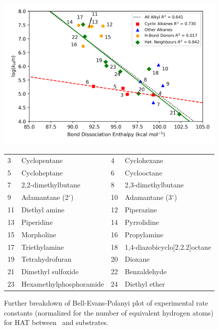\begin{doublespace}
\begin{figure}[!htbp]
  \centering
  \includegraphics[width=\textwidth]{figures/bep-breakdown}
  \begin{tabularx}{\textwidth}{| l X l X |}
    \hline
    3 & Cyclopentane & 4 & Cyclohexane \\
    5 & Cycloheptane & 6 & Cyclooctane \\
    7 & 2,2-dimethylbutane & 8 & 2,3-dimethylbutane \\
    9 & Adamantane (2$^\circ$) & 10 & Adamantane (3$^\circ$) \\
    11 & Diethyl amine & 12 & Piperazine \\
    13 & Piperidine & 14 & Pyrrolidine \\
    15 & Morpholine & 16 & Propylamine \\
    17 & Triethylamine & 18 & 1,4-diazobicyclo[2.2.2]octane \\
    19 & Tetrahydrofuran & 20 & Dioxane \\
    21 & Dimethyl sulfoxide & 22 & Benzaldehyde \\
    23 & Hexamethylphosphoramide & 24 & Diethyl ether \\
    \hline
  \end{tabularx}
  \caption[Further breakdown of Bell-Evans-Polanyi plot of experimental rate
  constants (normalized for the number of equivalent hydrogen atoms) for HAT
  between \cumo\ and alkyl substrates against BDEs calculated using the
  ROCBS-QB3 method.]{Further breakdown of Bell-Evans-Polanyi plot of
  experimental rate constants (normalized for the number of equivalent hydrogen
  atoms) for HAT between \cumo\ and  substrates.} \label{fig:bep-breakdown}
\end{figure}


\end{doublespace}
